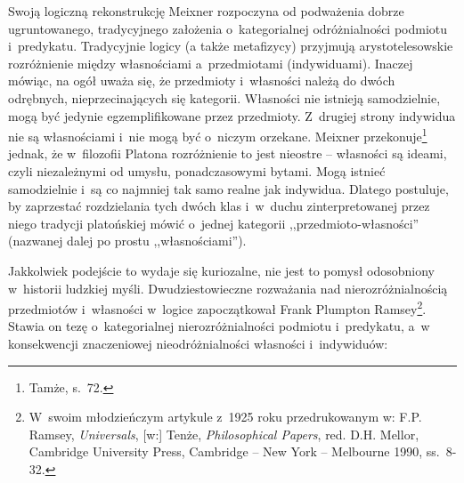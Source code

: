 Swoją logiczną rekonstrukcję Meixner rozpoczyna od podważenia dobrze ugruntowanego, tradycyjnego założenia o~kategorialnej odróżnialności podmiotu i~predykatu. Tradycyjnie logicy (a także metafizycy) przyjmują arystotelesowskie rozróżnienie między własnościami a~przedmiotami (indywiduami). Inaczej mówiąc, na ogół uważa się, że przedmioty i~własności należą do dwóch odrębnych, nieprzecinających się kategorii. Własności nie istnieją samodzielnie, mogą być jedynie egzemplifikowane przez przedmioty. Z~drugiej strony indywidua nie są własnościami i~nie mogą być o~niczym orzekane. Meixner przekonuje\footnote{Tamże, s.~72.} jednak, że w~filozofii Platona rozróżnienie to jest nieostre -- własności są ideami, czyli niezależnymi od umysłu, ponadczasowymi bytami. Mogą istnieć samodzielnie i~są co najmniej tak samo realne jak indywidua. Dlatego postuluje, by zaprzestać rozdzielania tych dwóch klas i~w~duchu zinterpretowanej przez niego tradycji platońskiej mówić o~jednej kategorii ,,przedmioto-własności'' (nazwanej dalej po prostu ,,własnościami'').

Jakkolwiek podejście to wydaje się kuriozalne, nie jest to pomysł odosobniony w~historii ludzkiej myśli. Dwudziestowieczne rozważania nad nierozróżnialnością przedmiotów i~własności w~logice zapoczątkował Frank Plumpton Ramsey\footnote{W~swoim młodzieńczym artykule z~1925 roku przedrukowanym w: F.P. Ramsey, \textit{Universals}, [w:] Tenże, \textit{Philosophical Papers}, red. D.H. Mellor, Cambridge University Press, Cambridge -- New York -- Melbourne 1990, ss.~8-32.}. Stawia on tezę o~kategorialnej nierozróżnialności podmiotu i~predykatu, a~w konsekwencji znaczeniowej nieodróżnialności własności i~indywiduów:

